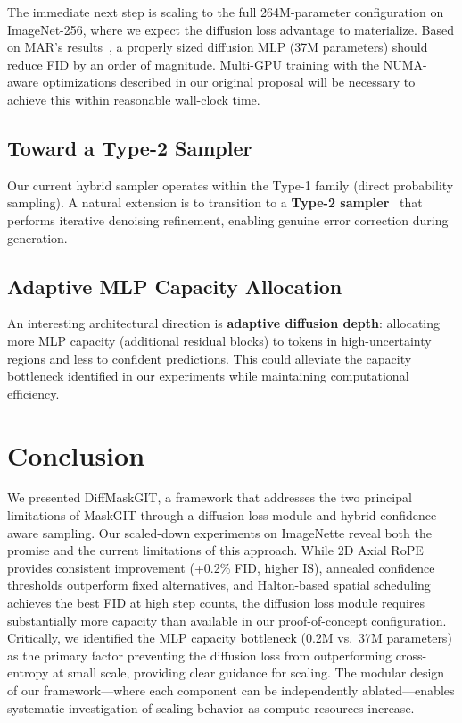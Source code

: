 \documentclass[conference]{IEEEtran}
\begin{document}
The immediate next step is scaling to the full 264M-parameter configuration on ImageNet-256, where we expect the diffusion loss advantage to materialize. Based on MAR's results~\cite{li2024mar}, a properly sized diffusion MLP (37M parameters) should reduce FID by an order of magnitude. Multi-GPU training with the NUMA-aware optimizations described in our original proposal will be necessary to achieve this within reasonable wall-clock time.

\subsection{Toward a Type-2 Sampler}

Our current hybrid sampler operates within the Type-1 family (direct probability sampling). A natural extension is to transition to a \textbf{Type-2 sampler}~\cite{hayakawa2025demystifying} that performs iterative denoising refinement, enabling genuine error correction during generation.

\subsection{Adaptive MLP Capacity Allocation}

An interesting architectural direction is \textbf{adaptive diffusion depth}: allocating more MLP capacity (additional residual blocks) to tokens in high-uncertainty regions and less to confident predictions. This could alleviate the capacity bottleneck identified in our experiments while maintaining computational efficiency.


\section{Conclusion}
\label{sec:conclusion}

We presented DiffMaskGIT, a framework that addresses the two principal limitations of MaskGIT through a diffusion loss module and hybrid confidence-aware sampling. Our scaled-down experiments on ImageNette reveal both the promise and the current limitations of this approach. While 2D Axial RoPE provides consistent improvement (+0.2\% FID, higher IS), annealed confidence thresholds outperform fixed alternatives, and Halton-based spatial scheduling achieves the best FID at high step counts, the diffusion loss module requires substantially more capacity than available in our proof-of-concept configuration. Critically, we identified the MLP capacity bottleneck (0.2M vs.\ 37M parameters) as the primary factor preventing the diffusion loss from outperforming cross-entropy at small scale, providing clear guidance for scaling. The modular design of our framework---where each component can be independently ablated---enables systematic investigation of scaling behavior as compute resources increase.
\end{document}
